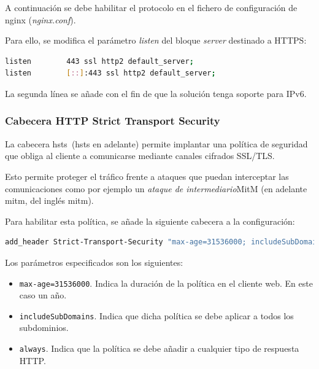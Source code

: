 \par A continuación se debe  habilitar el protocolo en el fichero de configuración de nginx ({\em nginx.conf}).
\par Para ello, se modifica el parámetro {\em listen} del bloque {\em server} destinado a HTTPS:
\begin{lstlisting}[language=bash]
listen        443 ssl http2 default_server;
listen        [::]:443 ssl http2 default_server;
\end{lstlisting}

\par La segunda línea se añade con el fin de que la solución tenga soporte para IPv6.

\subsubsection{Cabecera HTTP Strict Transport Security}
\par La cabecera \acrlong{hsts}~\cite{wiki:hsts}(\acrshort{hsts} en adelante) permite implantar una política de seguridad que obliga al cliente a comunicarse mediante canales cifrados SSL/TLS.
\par Esto permite proteger el tráfico frente a ataques que puedan interceptar las comunicaciones como por ejemplo un {\em ataque de intermediario}\gls{MitM} (en adelante \acrshort{mitm}, del inglés \acrlong{mitm}).
\par Para habilitar esta política, se añade la siguiente cabecera a la configuración:
\begin{lstlisting}[language=bash]
add_header Strict-Transport-Security "max-age=31536000; includeSubDomains" always;
\end{lstlisting}
\par Los parámetros especificados son los siguientes:
\begin{itemize}
\item  \lstinline{max-age=31536000}. Indica la duración de la política en el cliente web. En este caso un año.
\item  \lstinline{includeSubDomains}. Indica que dicha política se debe aplicar a todos los subdominios.
\item  \lstinline{always}. Indica que la política se debe añadir a cualquier tipo de respuesta HTTP.
\end{itemize}

